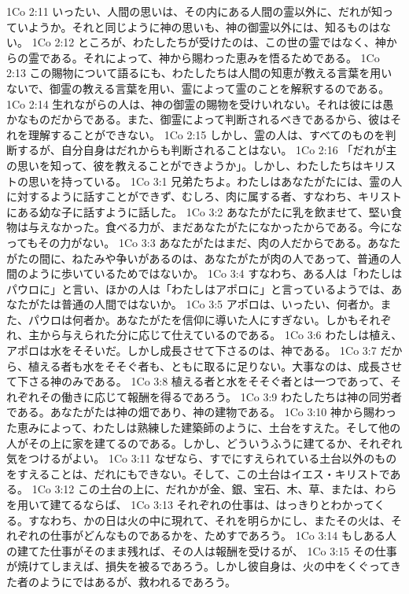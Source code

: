 1Co 2:11  いったい、人間の思いは、その内にある人間の霊以外に、だれが知っていようか。それと同じように神の思いも、神の御霊以外には、知るものはない。
1Co 2:12  ところが、わたしたちが受けたのは、この世の霊ではなく、神からの霊である。それによって、神から賜わった恵みを悟るためである。
1Co 2:13  この賜物について語るにも、わたしたちは人間の知恵が教える言葉を用いないで、御霊の教える言葉を用い、霊によって霊のことを解釈するのである。
1Co 2:14  生れながらの人は、神の御霊の賜物を受けいれない。それは彼には愚かなものだからである。また、御霊によって判断されるべきであるから、彼はそれを理解することができない。
1Co 2:15  しかし、霊の人は、すべてのものを判断するが、自分自身はだれからも判断されることはない。
1Co 2:16  「だれが主の思いを知って、彼を教えることができようか」。しかし、わたしたちはキリストの思いを持っている。
1Co 3:1  兄弟たちよ。わたしはあなたがたには、霊の人に対するように話すことができず、むしろ、肉に属する者、すなわち、キリストにある幼な子に話すように話した。
1Co 3:2  あなたがたに乳を飲ませて、堅い食物は与えなかった。食べる力が、まだあなたがたになかったからである。今になってもその力がない。
1Co 3:3  あなたがたはまだ、肉の人だからである。あなたがたの間に、ねたみや争いがあるのは、あなたがたが肉の人であって、普通の人間のように歩いているためではないか。
1Co 3:4  すなわち、ある人は「わたしはパウロに」と言い、ほかの人は「わたしはアポロに」と言っているようでは、あなたがたは普通の人間ではないか。
1Co 3:5  アポロは、いったい、何者か。また、パウロは何者か。あなたがたを信仰に導いた人にすぎない。しかもそれぞれ、主から与えられた分に応じて仕えているのである。
1Co 3:6  わたしは植え、アポロは水をそそいだ。しかし成長させて下さるのは、神である。
1Co 3:7  だから、植える者も水をそそぐ者も、ともに取るに足りない。大事なのは、成長させて下さる神のみである。
1Co 3:8  植える者と水をそそぐ者とは一つであって、それぞれその働きに応じて報酬を得るであろう。
1Co 3:9  わたしたちは神の同労者である。あなたがたは神の畑であり、神の建物である。
1Co 3:10  神から賜わった恵みによって、わたしは熟練した建築師のように、土台をすえた。そして他の人がその上に家を建てるのである。しかし、どういうふうに建てるか、それぞれ気をつけるがよい。
1Co 3:11  なぜなら、すでにすえられている土台以外のものをすえることは、だれにもできない。そして、この土台はイエス・キリストである。
1Co 3:12  この土台の上に、だれかが金、銀、宝石、木、草、または、わらを用いて建てるならば、
1Co 3:13  それぞれの仕事は、はっきりとわかってくる。すなわち、かの日は火の中に現れて、それを明らかにし、またその火は、それぞれの仕事がどんなものであるかを、ためすであろう。
1Co 3:14  もしある人の建てた仕事がそのまま残れば、その人は報酬を受けるが、
1Co 3:15  その仕事が焼けてしまえば、損失を被るであろう。しかし彼自身は、火の中をくぐってきた者のようにではあるが、救われるであろう。
